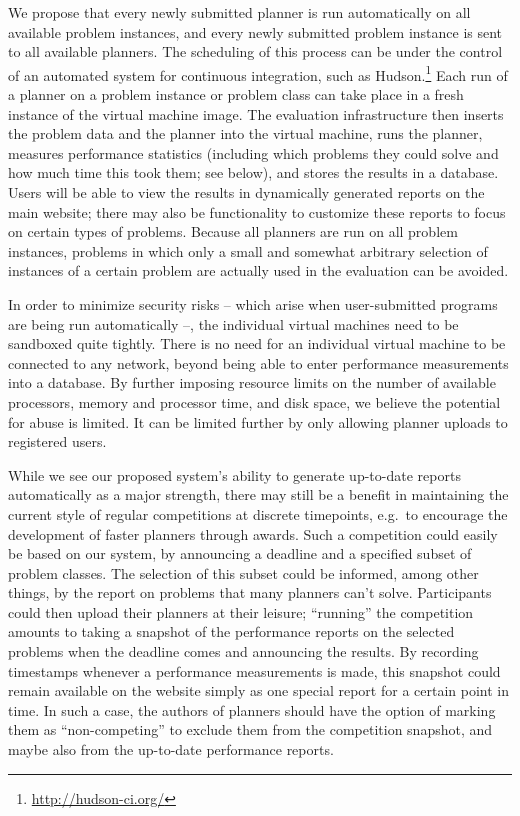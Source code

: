 We propose that every newly submitted planner is run automatically on
all available problem instances, and every newly submitted problem
instance is sent to all available planners.  The scheduling of this
process can be under the control of an automated system for continuous
integration, such as Hudson.\footnote{\url{http://hudson-ci.org/}}
Each run of a planner on a problem instance or problem class can take
place in a fresh instance of the virtual machine image.  The
evaluation infrastructure then inserts the problem data and the
planner into the virtual machine, runs the planner, measures
performance statistics (including which problems they could solve and
how much time this took them; see below), and stores the results in a
database.  Users will be able to view the results in dynamically
generated reports on the main website; there may also be functionality
to customize these reports to focus on certain types of problems.
Because all planners are run on all problem instances, problems in
which only a small and somewhat arbitrary selection of instances of a
certain problem are actually used in the evaluation \cite{pg2008002}
can be avoided.

In order to minimize security risks -- which arise when user-submitted
programs are being run automatically --, the individual virtual
machines need to be sandboxed quite tightly.  There is no need for an
individual virtual machine to be connected to any network, beyond
being able to enter performance measurements into a database.  By
further imposing resource limits on the number of available
processors, memory and processor time, and disk space, we believe the
potential for abuse is limited.  It can be limited further by only
allowing planner uploads to registered users.

While we see our proposed system's ability to generate up-to-date
reports automatically as a major strength, there may still be a
benefit in maintaining the current style of regular competitions at
discrete timepoints, e.g.\ to encourage the development of faster
planners through awards.  Such a competition could easily be based on
our system, by announcing a deadline and a specified subset of problem
classes. The selection of this subset could be informed, among other
things, by the report on problems that many planners can't
solve. Participants could then upload their planners at their leisure;
``running'' the competition amounts to taking a snapshot of the
performance reports on the selected problems when the deadline comes
and announcing the results.  By recording timestamps whenever a
performance measurements is made, this snapshot could remain available
on the website simply as one special report for a certain point in
time.  In such a case, the authors of planners should have the option
of marking them as ``non-competing'' to exclude them from the
competition snapshot, and maybe also from the up-to-date performance
reports.



